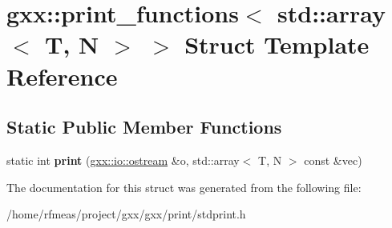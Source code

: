 \hypertarget{structgxx_1_1print__functions_3_01std_1_1array_3_01T_00_01N_01_4_01_4}{}\section{gxx\+:\+:print\+\_\+functions$<$ std\+:\+:array$<$ T, N $>$ $>$ Struct Template Reference}
\label{structgxx_1_1print__functions_3_01std_1_1array_3_01T_00_01N_01_4_01_4}
\subsection*{Static Public Member Functions}
\begin{DoxyCompactItemize}
\item 
static int {\bfseries print} (\hyperlink{classgxx_1_1io_1_1ostream}{gxx\+::io\+::ostream} \&o, std\+::array$<$ T, N $>$ const \&vec)\hypertarget{structgxx_1_1print__functions_3_01std_1_1array_3_01T_00_01N_01_4_01_4_a895ad7f8a69d2a918cfceb612fc9d491}{}\label{structgxx_1_1print__functions_3_01std_1_1array_3_01T_00_01N_01_4_01_4_a895ad7f8a69d2a918cfceb612fc9d491}

\end{DoxyCompactItemize}


The documentation for this struct was generated from the following file\+:\begin{DoxyCompactItemize}
\item 
/home/rfmeas/project/gxx/gxx/print/stdprint.\+h\end{DoxyCompactItemize}
